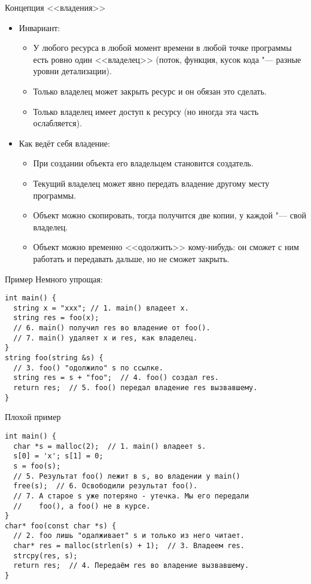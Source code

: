 \begin{frame}[t]{Концепция <<владения>>}
	\begin{itemize}
		\item Инвариант:
			\begin{itemize}
				\item
					У любого ресурса в любой момент времени в любой точке программы есть ровно один <<владелец>>
					(поток, функция, кусок кода "--- разные уровни детализации).
				\item Только владелец может закрыть ресурс и он обязан это сделать.
				\item Только владелец имеет доступ к ресурсу (но иногда эта часть ослабляется).
			\end{itemize}
		\item Как ведёт себя владение:
			\begin{itemize}
				\item При создании объекта его владельцем становится создатель.
				\item Текущий владелец может явно передать владение другому месту программы.
				\item Объект можно скопировать, тогда получится две копии, у каждой "--- свой владелец.
				\item Объект можно временно <<одолжить>> кому-нибудь: он сможет с ним работать и передавать дальше, но не сможет закрыть.
			\end{itemize}
	\end{itemize}
\end{frame}

\begin{frame}[t,fragile]{Пример}
	Немного упрощая:
\begin{verbatim}
int main() {
  string x = "xxx"; // 1. main() владеет x.
  string res = foo(x);
  // 6. main() получил res во владение от foo().
  // 7. main() удаляет x и res, как владелец.
}
string foo(string &s) {
  // 3. foo() "одолжило" s по ссылке.
  string res = s + "foo";  // 4. foo() создал res.
  return res;  // 5. foo() передал владение res вызвавшему.
}
\end{verbatim}
\end{frame}

\begin{frame}[t,fragile]{Плохой пример}
\begin{verbatim}
int main() {
  char *s = malloc(2);  // 1. main() владеет s.
  s[0] = 'x'; s[1] = 0;
  s = foo(s);
  // 5. Результат foo() лежит в s, во владении у main()
  free(s);  // 6. Освободили результат foo().
  // 7. А старое s уже потеряно - утечка. Мы его передали
  //    foo(), а foo() не в курсе.
}
char* foo(const char *s) {
  // 2. foo лишь "одалживает" s и только из него читает.
  char* res = malloc(strlen(s) + 1);  // 3. Владеем res.
  strcpy(res, s);
  return res;  // 4. Передаём res во владение вызвавшему.
}
\end{verbatim}
\end{frame}

